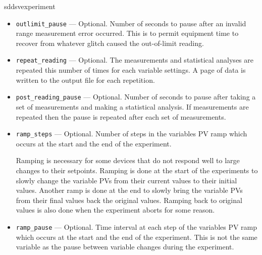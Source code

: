\begin{sddsprog}{sddsvexperiment}
\begin{itemize}
\begin{itemize}
   \item {\verb+outlimit_pause+} --- Optional. Number of seconds to
      pause after an invalid range measurement error occurred. This is
      to permit equipment time to recover from whatever glitch caused
      the out-of-limit reading.

   \item {\verb+repeat_reading+} --- Optional. The measurements and
      statistical analyses are repeated this number of times for each
      variable settings. A page of data is written to the output file
      for each repetition.

   \item {\verb+post_reading_pause+} --- Optional. Number of seconds
      to pause after taking a set of measurements and making a
      statistical analysis.  If measurements are repeated then the
      pause is repeated after each set of measurements.

   \item {\verb+ramp_steps+} --- Optional. Number of steps in the
      variables PV ramp which occurs at the start and the end of the
      experiment.

      Ramping is necessary for some devices that do not respond well
      to large changes to their setpoints. Ramping is done at the
      start of the experiments to slowly change the variable PVs from
      their current values to their initial values. Another ramp is
      done at the end to slowly bring the variable PVs from their
      final values back the original values. Ramping back to original
      values is also done when the experiment aborts for some reason.

   \item {\verb+ramp_pause+} --- Optional. Time interval at each step
      of the variables PV ramp which occurs at the start and the end
      of the experiment. This is not the same variable as the pause
      between variable changes during the experiment.
\end{itemize}


\end{itemize}
\end{sddsprog}
